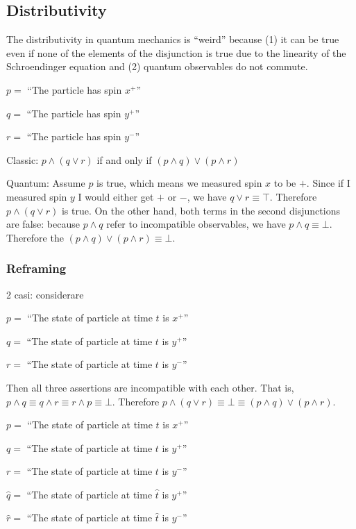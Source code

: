 \documentclass[10pt,twocolumn, nofootinbib]{revtex4-1}
\begin{document}
\subsection{Distributivity}

The distributivity in quantum mechanics is ``weird'' because (1) it can be true even if none of the elements of the disjunction is true due to the linearity of the Schroendinger equation and (2) quantum observables do not commute. 

\begin{description}
    \item $p =$ ``The particle has spin $x^+$''
    \item $q =$ ``The particle has spin $y^+$''
    \item $r =$ ``The particle has spin $y^-$''
\end{description}

Classic: $p \wedge (q \vee r)$ if and only if $(p \wedge  q) \vee (p \wedge r)$

Quantum: Assume $p$ is true, which means we measured spin $x$ to be $+$. Since if I measured spin $y$ I would either get $+$ or $-$, we have $q \vee r \equiv \top$. Therefore $p \wedge (q \vee r)$ is true. On the other hand, both terms in the second disjunctions are false: because $p \wedge  q$ refer to incompatible observables, we have $p \wedge  q \equiv \bot$. Therefore the $(p \wedge  q) \vee (p \wedge r) \equiv \bot$.

\subsubsection{Reframing}

2 casi: considerare

\begin{description}
    \item $p =$ ``The state of particle at time $t$ is $x^+$''
    \item $q =$ ``The state of particle at time $t$ is $y^+$''
    \item $r =$ ``The state of particle at time $t$ is $y^-$''
\end{description}

Then all three assertions are incompatible with each other. That is, $p \wedge q \equiv q \wedge r \equiv r \wedge p \equiv \bot$. Therefore $p \wedge (q \vee r) \equiv \bot \equiv (p \wedge  q) \vee (p \wedge r)$.

\begin{description}
    \item $p =$ ``The state of particle at time $t$ is $x^+$''
    \item $q =$ ``The state of particle at time $t$ is $y^+$''
    \item $r =$ ``The state of particle at time $t$ is $y^-$''
    \item $\hat{q} =$ ``The state of particle at time $\hat{t}$ is $y^+$''
    \item $\hat{r} =$ ``The state of particle at time $\hat{t}$ is $y^-$''
\end{description}
\end{document}
